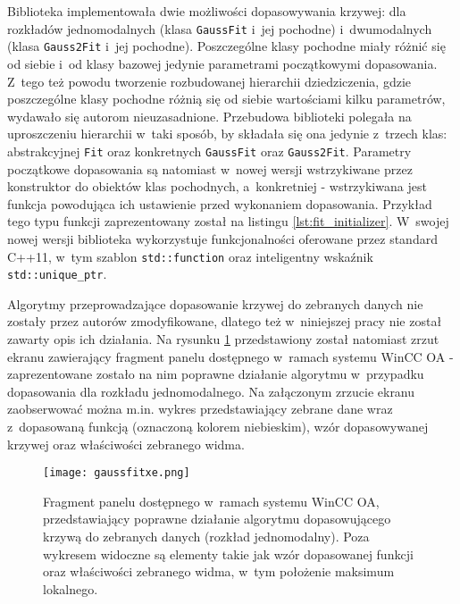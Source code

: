 Biblioteka implementowała dwie możliwości dopasowywania krzywej: dla rozkładów jednomodalnych (klasa \lstinline{GaussFit} i~jej pochodne) i~dwumodalnych (klasa \lstinline{Gauss2Fit} i~jej pochodne). Poszczególne klasy pochodne miały różnić się od siebie i~od klasy bazowej jedynie parametrami początkowymi dopasowania. Z~tego też powodu tworzenie rozbudowanej hierarchii dziedziczenia, gdzie poszczególne klasy pochodne różnią się od siebie wartościami kilku parametrów, wydawało się autorom nieuzasadnione. Przebudowa biblioteki polegała na uproszczeniu hierarchii w~taki sposób, by składała się ona jedynie z~trzech klas: abstrakcyjnej \lstinline{Fit} oraz konkretnych \lstinline{GaussFit} oraz \lstinline{Gauss2Fit}. Parametry początkowe dopasowania są natomiast w~nowej wersji wstrzykiwane przez konstruktor do obiektów klas pochodnych, a~konkretniej - wstrzykiwana jest funkcja powodująca ich ustawienie przed wykonaniem dopasowania. Przykład tego typu funkcji zaprezentowany został na listingu \ref{lst:fit_initializer}. W~swojej nowej wersji biblioteka wykorzystuje funkcjonalności oferowane przez standard C++11, w~tym szablon \lstinline{std::function} oraz inteligentny wskaźnik \lstinline{std::unique_ptr}.



Algorytmy przeprowadzające dopasowanie krzywej do zebranych danych nie zostały przez autorów zmodyfikowane, dlatego też w~niniejszej pracy nie został zawarty opis ich działania. Na rysunku \ref{fig:fit_example_good_1} przedstawiony został natomiast zrzut ekranu zawierający fragment panelu dostępnego w~ramach systemu WinCC OA - zaprezentowane zostało na nim poprawne działanie algorytmu w~przypadku dopasowania dla rozkładu jednomodalnego. Na załączonym zrzucie ekranu zaobserwować można m.in. wykres przedstawiający zebrane dane wraz z~dopasowaną funkcją (oznaczoną kolorem niebieskim), wzór dopasowywanej krzywej oraz właściwości zebranego widma.

\begin{figure}[H]
\centering
\texttt{[image: gaussfitxe.png]}
\caption{Fragment panelu dostępnego w~ramach systemu WinCC OA, przedstawiający poprawne działanie algorytmu dopasowującego krzywą do zebranych danych (rozkład jednomodalny). Poza wykresem widoczne są elementy takie jak wzór dopasowanej funkcji oraz właściwości zebranego widma, w~tym położenie maksimum lokalnego.}
\label{fig:fit_example_good_1}
\end{figure}


